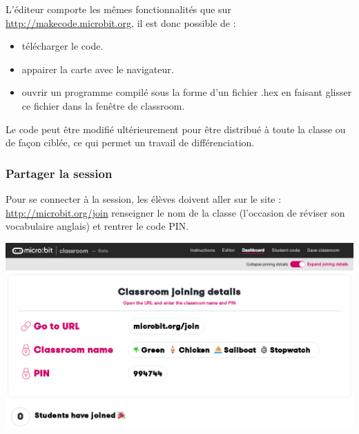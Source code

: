 \begin{remarque}
    L'éditeur comporte les mêmes fonctionnalités que sur \url{http://makecode.microbit.org}, il est donc possible de :
    \begin{itemize}
        \item télécharger le code.
        \item appairer la carte \mb avec le navigateur.
        \item ouvrir un programme compilé sous la forme d'un fichier .hex en faisant glisser ce fichier
        dans la fenêtre de classroom.
        
    \end{itemize}
    
    Le code peut être modifié ultérieurement pour être distribué à toute la classe ou de façon ciblée,
     ce qui permet un travail de différenciation.
 
\end{remarque}

\vspace{5mm}

\subsubsection{Partager la session}

\begin{methode}
    Pour se connecter à la session, les élèves doivent aller sur le site :  \url{http://microbit.org/join}
     renseigner le nom de la classe (l'occasion de réviser son vocabulaire anglais)
    et rentrer le code PIN.
    \vspace{5mm}

    \centerline{\includegraphics[width=0.7\linewidth]{res/classroom_dashboard2.png}}
    
\end{methode}


\newpage
\vspace{5mm}~\\

